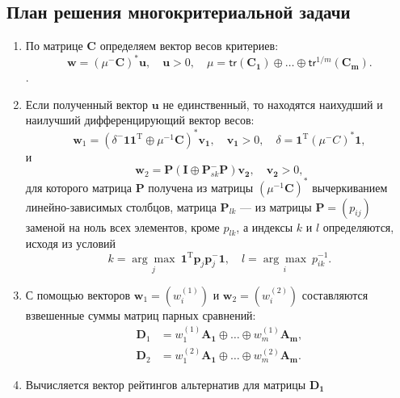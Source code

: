 \documentclass[specialist,
  substylefile = spbu.rtx,
  href,
  colorlinks=true,
  12pt]{disser}
\begin{document}
\subsection{План решения многокритериальной задачи}
\begin{enumerate}
	\item По матрице $\boldsymbol{C}$ определяем вектор весов критериев:
	\begin{equation}
		\boldsymbol{w} = (\mu^{-}\boldsymbol{C})^*\boldsymbol{u},\quad  \boldsymbol{u} > 0,\quad \mu = \mathsf{tr}(\boldsymbol{C_1}) \oplus\ldots\oplus \mathsf{tr}^{1/m}(\boldsymbol{C_m}).
	\end{equation}.
	\item Если полученный вектор $\boldsymbol{u}$ не единственный, то находятся наихудший и наилучший дифференцирующий вектор весов:
	\begin{equation*}
		\boldsymbol{w}_1 = (\delta^-\boldsymbol{11}^\mathrm{T} \oplus \mu^{-1}\boldsymbol{C})^*\boldsymbol{v_1},\quad  \boldsymbol{v_1} > 0,\quad \delta = \boldsymbol{1}^\mathrm{T}(\mu^{-}C)^*\boldsymbol{1}, 
	\end{equation*}
	и
	\begin{equation*}
		\boldsymbol{w}_2 =\boldsymbol{P}(\boldsymbol{I}\oplus\boldsymbol{P}^{-}_{sk}\boldsymbol{P})\boldsymbol{v_2},\quad \boldsymbol{v_2} > 0, 
	\end{equation*}
	для которого матрица $\boldsymbol{P}$ получена из матрицы $(\mu^{-1}\boldsymbol{C})^*$ вычеркиванием линейно-зависимых столбцов, матрица $\boldsymbol{P}_{lk}$ --- из матрицы $\boldsymbol{P} = (p_{ij})$ заменой на ноль всех элементов, кроме $p_{lk}$, а индексы $k$ и $l$ определяются, исходя из условий
	\begin{equation*}
		k = \underset{j}{\arg\max}~\boldsymbol{1}^\mathrm{T}\boldsymbol{p}_j\boldsymbol{p}^-_j\boldsymbol{1},\quad l = \underset{i}{\arg\max} ~p^{-1}_{ik}.
	\end{equation*}
	\item С помощью векторов $\boldsymbol{w}_1 = (w^{(1)}_i)$ и $\boldsymbol{w}_2 = (w^{(2)}_i)$ составляются взвешенные
	суммы матриц парных сравнений:
	\begin{align*}
		\boldsymbol{D}_1 &= w^{(1)}_1\boldsymbol{A_1}\oplus\ldots\oplus w^{(1)}_m\boldsymbol{A_m}, \\
		\boldsymbol{D}_2 &=w^{(2)}_1\boldsymbol{A_1}\oplus\ldots\oplus w^{(2)}_m\boldsymbol{A_m}.
	\end{align*}
	\item Вычисляется вектор рейтингов альтернатив для матрицы $\boldsymbol{D_1}$

\end{enumerate}
\end{document}
